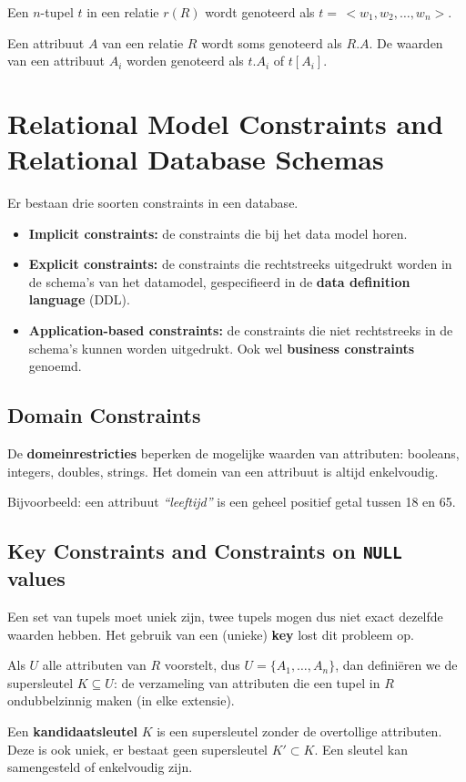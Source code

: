 Een $n$-tupel $t$ in een relatie $r(R)$ wordt genoteerd als $t =\, <w_1, w_2, \dots, w_n>$.

Een attribuut $A$ van een relatie $R$ wordt soms genoteerd als $R.A$. De waarden van een attribuut $A_i$ worden genoteerd als $t.A_i$ of $t[A_i]$.

\section{Relational Model Constraints and Relational Database Schemas}
Er bestaan drie soorten constraints in een database.
\begin{itemize}
	\item \textbf{Implicit constraints:} de constraints die bij het data model horen.
	\item \textbf{Explicit constraints:} de constraints die rechtstreeks uitgedrukt worden in de schema's van het datamodel, gespecifieerd in de \textbf{data definition language} (DDL).
	\item \textbf{Application-based constraints:} de constraints die niet rechtstreeks in de schema's kunnen worden uitgedrukt. Ook wel \textbf{business constraints} genoemd.
\end{itemize}

\subsection{Domain Constraints}
De \textbf{domeinrestricties} beperken de mogelijke waarden van attributen: booleans, integers, doubles, strings. Het domein van een attribuut is altijd enkelvoudig.

Bijvoorbeeld: een attribuut \textit{``leeftijd''} is een geheel positief getal tussen 18 en 65. 

\subsection{Key Constraints and Constraints on \texttt{NULL} values}
Een set van tupels moet uniek zijn, twee tupels mogen dus niet exact dezelfde waarden hebben. Het gebruik van een (unieke) \textbf{key} lost dit probleem op.

Als $U$ alle attributen van $R$ voorstelt, dus $U = \{A_1,\dots,A_n\}$, dan defini\"eren we de supersleutel $K \subseteq U$: de verzameling van attributen die een tupel in $R$ ondubbelzinnig maken (in elke extensie).

Een \textbf{kandidaatsleutel} $K$ is een supersleutel zonder de overtollige attributen. Deze is ook uniek, er bestaat geen supersleutel $K' \subset K$. Een sleutel kan samengesteld of enkelvoudig zijn.

